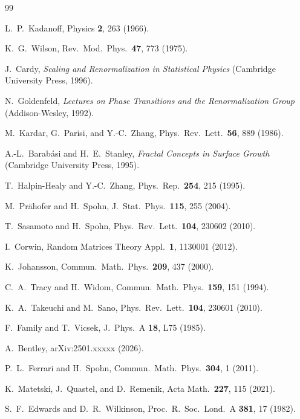 \documentclass[aps,pre,reprint,amsmath,amssymb,superscriptaddress]{revtex4-2}
\begin{document}
\begin{thebibliography}{99}

 L.~P.~Kadanoff, Physics \textbf{2}, 263 (1966).

 K.~G.~Wilson, Rev.~Mod.~Phys.~\textbf{47}, 773 (1975).

 J.~Cardy, \textit{Scaling and Renormalization in Statistical Physics} (Cambridge University Press, 1996).

 N.~Goldenfeld, \textit{Lectures on Phase Transitions and the Renormalization Group} (Addison-Wesley, 1992).

 M.~Kardar, G.~Parisi, and Y.-C.~Zhang, Phys.~Rev.~Lett.~\textbf{56}, 889 (1986).

 A.-L.~Barab\'asi and H.~E.~Stanley, \textit{Fractal Concepts in Surface Growth} (Cambridge University Press, 1995).

 T.~Halpin-Healy and Y.-C.~Zhang, Phys.~Rep.~\textbf{254}, 215 (1995).

 M.~Pr\"ahofer and H.~Spohn, J.~Stat.~Phys.~\textbf{115}, 255 (2004).

 T.~Sasamoto and H.~Spohn, Phys.~Rev.~Lett.~\textbf{104}, 230602 (2010).

 I.~Corwin, Random Matrices Theory Appl.~\textbf{1}, 1130001 (2012).

 K.~Johansson, Commun.~Math.~Phys.~\textbf{209}, 437 (2000).

 C.~A.~Tracy and H.~Widom, Commun.~Math.~Phys.~\textbf{159}, 151 (1994).

 K.~A.~Takeuchi and M.~Sano, Phys.~Rev.~Lett.~\textbf{104}, 230601 (2010).

 F.~Family and T.~Vicsek, J.~Phys.~A \textbf{18}, L75 (1985).

 A.~Bentley, arXiv:2501.xxxxx (2026).

 P.~L.~Ferrari and H.~Spohn, Commun.~Math.~Phys.~\textbf{304}, 1 (2011).

 K.~Matetski, J.~Quastel, and D.~Remenik, Acta Math.~\textbf{227}, 115 (2021).

 S.~F.~Edwards and D.~R.~Wilkinson, Proc.~R.~Soc.~Lond.~A \textbf{381}, 17 (1982).


\end{thebibliography}
\end{document}
